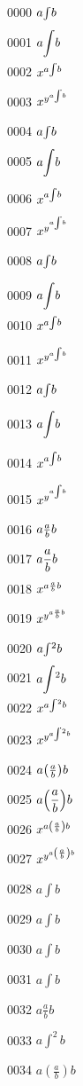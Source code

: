 \documentclass{article}
\begin{document}
0000 $a\smash{\int}b$\par
0001 $\displaystyle a\smash{\int}b$\par
0002 $x^{a\smash{\int}b}$\par
0003 $x^{y^{a\smash{\int}b}}$\par
0004 $a\smash[t]{\int}b$\par
0005 $\displaystyle a\smash[t]{\int}b$\par
0006 $x^{a\smash[t]{\int}b}$\par
0007 $x^{y^{a\smash[t]{\int}b}}$\par
0008 $a\smash[b]{\int}b$\par
0009 $\displaystyle a\smash[b]{\int}b$\par
0010 $x^{a\smash[b]{\int}b}$\par
0011 $x^{y^{a\smash[b]{\int}b}}$\par
0012 $a\smash[x]{\int}b$\par
0013 $\displaystyle a\smash[x]{\int}b$\par
0014 $x^{a\smash[x]{\int}b}$\par
0015 $x^{y^{a\smash[x]{\int}b}}$\par
0016 $a\smash{\frac{a}{b}}b$\par
0017 $\displaystyle a\smash{\frac{a}{b}}b$\par
0018 $x^{a\smash{\frac{a}{b}}b}$\par
0019 $x^{y^{a\smash{\frac{a}{b}}b}}$\par
0020 $a\smash{\int}^{2}b$\par
0021 $\displaystyle a\smash{\int}^{2}b$\par
0022 $x^{a\smash{\int}^{2}b}$\par
0023 $x^{y^{a\smash{\int}^{2}b}}$\par
0024 $a\smash{\left(\frac{a}{b}\right)}b$\par
0025 $\displaystyle a\smash{\left(\frac{a}{b}\right)}b$\par
0026 $x^{a\smash{\left(\frac{a}{b}\right)}b}$\par
0027 $x^{y^{a\smash{\left(\frac{a}{b}\right)}b}}$\par
0028 $a{\int}b$\par
0029 $a{\int}b$\par
0030 $a{\int}b$\par
0031 $a{\int}b$\par
0032 $a{\frac{a}{b}}b$\par
0033 $a{\int}^{2}b$\par
0034 $a{\left(\frac{a}{b}\right)}b$\par
\end{document}
